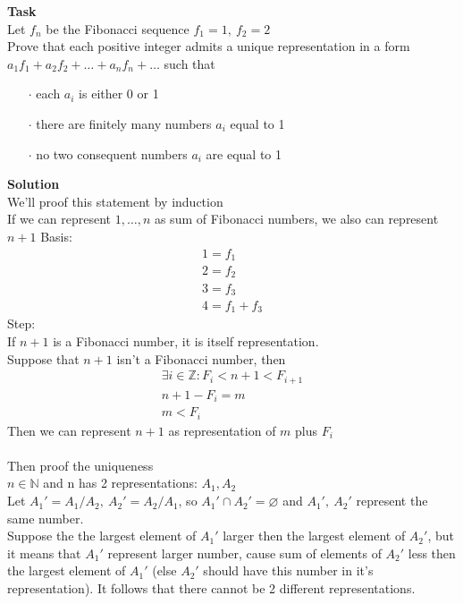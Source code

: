 \noindent
\textbf{Task}\\
Let $f_n$ be the Fibonacci sequence $f_1 = 1,\ f_2 = 2$\\
Prove that each positive integer admits a unique representation in a form\\
$a_1f_1 + a_2f_2 + \ldots + a_nf_n + \ldots$ such that
\begin{enumerate}
\item[$\cdot$] each $a_i$ is either 0 or 1
\item[$\cdot$] there are finitely many numbers $a_i$ equal to 1
\item[$\cdot$] no two consequent numbers $a_i$ are equal to 1
\end{enumerate}
\textbf{Solution}\\
We'll proof this statement by induction\\
If we can represent $1, \ldots, n$ as sum of Fibonacci numbers, we also can represent $n+1$
Basis:
\begin{gather*}
	1 = f_1\\
	2 = f_2\\
	3 = f_3\\
	4= f_1 + f_3
\end{gather*}
Step:\\
If $n+1$ is a Fibonacci number, it is  itself representation.\\
Suppose that $n+1$ isn't a Fibonacci number, then
\begin{gather*}
	\exists i \in \mathbb{Z}: F_i < n+1 < F_{i+1}\\
	n+1 - F_i = m\\
	m < F_i
\end{gather*}
Then we can represent $n+1$ as representation of $m$ plus $F_i$\\
\\
\noindent
Then proof the uniqueness\\
$n \in \mathbb{N}$ and n has 2 representations: $A_1,A_2$\\
Let $A_1' = A_1\slash A_2,\ A_2' = A_2\slash A_1$, so $A_1' \cap A_2' = \varnothing$ and $A_1',\ A_2'$ represent the same number.\\
Suppose the the largest element of $A_1'$ larger then the largest element of $A_2'$, but it means that $A_1'$ represent larger number, cause sum of elements of $A_2'$ less then the largest element of $A_1'$ (else $A_2'$ should have this number in it's representation). It follows that there cannot be 2 different representations.